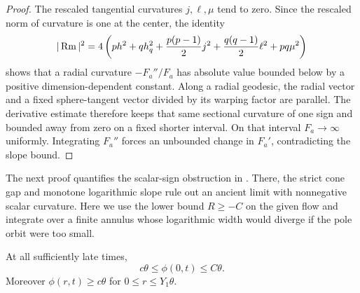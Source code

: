 \begin{proof}
The rescaled tangential curvatures \(j,\ell,\mu\) tend to zero. Since
the rescaled norm of curvature is one at the center, the identity
\begin{equation}\label{eq:curvature-norm}
|\operatorname{Rm}|^2=4\left(ph^2+qh_q^2+\frac{p(p-1)}2j^2
 +\frac{q(q-1)}2\ell^2+pq\mu^2\right)
\end{equation}
shows that a radial curvature \(-F_a''/F_a\) has absolute value bounded
below by a positive dimension-dependent constant. Along a radial geodesic,
the radial vector and a fixed sphere-tangent vector divided by its warping
factor are parallel. The derivative estimate therefore keeps that same
sectional curvature of one sign and bounded away from zero on a fixed
shorter interval. On that interval \(F_a\to\infty\) uniformly. Integrating
\(F_a''\) forces an unbounded change in \(F_a'\), contradicting the
slope bound.
\end{proof}

The next proof quantifies the scalar-sign obstruction in
\cite[Proposition~5.3]{Stolarski2019}. There, the strict cone gap and
monotone logarithmic slope rule out an ancient limit with nonnegative
scalar curvature. Here we use the lower bound \(R\ge-C\) on the given
flow and integrate over a finite annulus whose logarithmic width would
diverge if the pole orbit were too small.

\begin{lemma}\label{lem:pole-size}
At all sufficiently late times,
\begin{equation}\label{eq:pole-size}
c\theta\le\phi(0,t)\le C\theta.
\end{equation}
Moreover \(\phi(r,t)\ge c\theta\) for \(0\le r\le Y_1\theta\).
\end{lemma}

